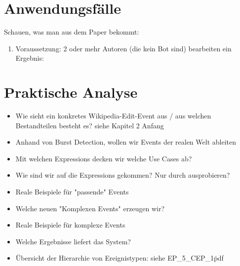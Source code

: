 \section{Anwendungsfälle}
Schauen, was man aus dem Paper bekommt: \cite{10.1007978-3-642-36973-5_22}

\begin{enumerate}
    \item
    Voraussetzung: 2 oder mehr Autoren (die kein Bot sind) bearbeiten ein
    Ergebnis:
\end{enumerate}




\section{Praktische Analyse}

\begin{itemize}
    \item Wie sieht ein konkretes Wikipedia-Edit-Event aus / aus welchen Bestandteilen besteht es?
        siehe \cite{10.1007978-3-642-36973-5_22} Kapitel 2 Anfang
    \item Anhand von Burst Detection, wollen wir Events der realen Welt ableiten \cite{Zhu:2003:EEB:956750.956789}
    \item Mit welchen Expressions decken wir welche Use Cases ab?
    \item Wie sind wir auf die Expressions gekommen? Nur durch ausprobieren?
    \item Reale Beispiele für "passende" Events
    \item Welche neuen "Komplexen Events" erzeugen wir?
    \item Reale Beispiele für komplexe Events
    \item Welche Ergebnisse liefert das System?
    \item Übersicht der Hierarchie von Ereignistypen: siehe EP\_5\_CEP\_1\.pdf
\end{itemize}